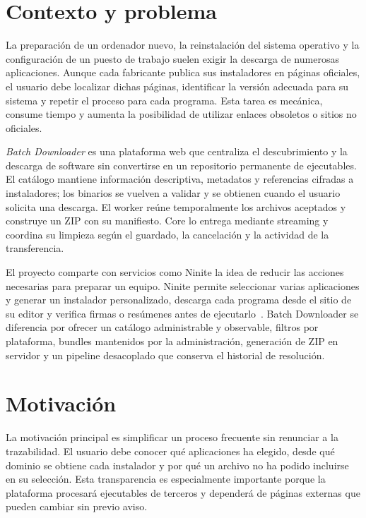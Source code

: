 
\section{Contexto y problema}

La preparación de un ordenador nuevo, la reinstalación del sistema operativo y la configuración de un puesto de trabajo suelen exigir la descarga de numerosas aplicaciones. Aunque cada fabricante publica sus instaladores en páginas oficiales, el usuario debe localizar dichas páginas, identificar la versión adecuada para su sistema y repetir el proceso para cada programa. Esta tarea es mecánica, consume tiempo y aumenta la posibilidad de utilizar enlaces obsoletos o sitios no oficiales.

\emph{Batch Downloader} es una plataforma web que centraliza el descubrimiento y la descarga de software sin convertirse en un repositorio permanente de ejecutables. El catálogo mantiene información descriptiva, metadatos y referencias cifradas a instaladores; los binarios se vuelven a validar y se obtienen cuando el usuario solicita una descarga. El worker reúne temporalmente los archivos aceptados y construye un ZIP con su manifiesto. Core lo entrega mediante streaming y coordina su limpieza según el guardado, la cancelación y la actividad de la transferencia.

El proyecto comparte con servicios como Ninite la idea de reducir las acciones necesarias para preparar un equipo. Ninite permite seleccionar varias aplicaciones y generar un instalador personalizado, descarga cada programa desde el sitio de su editor y verifica firmas o resúmenes antes de ejecutarlo~\cite{ninite}. Batch Downloader se diferencia por ofrecer un catálogo administrable y observable, filtros por plataforma, bundles mantenidos por la administración, generación de ZIP en servidor y un pipeline desacoplado que conserva el historial de resolución.

\section{Motivación}

La motivación principal es simplificar un proceso frecuente sin renunciar a la trazabilidad. El usuario debe conocer qué aplicaciones ha elegido, desde qué dominio se obtiene cada instalador y por qué un archivo no ha podido incluirse en su selección. Esta transparencia es especialmente importante porque la plataforma procesará ejecutables de terceros y dependerá de páginas externas que pueden cambiar sin previo aviso.

